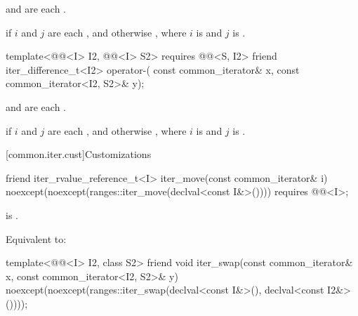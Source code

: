 \begin{itemdescr}
\pnum
\expects
{} and 
are each .

\pnum
\returns
{} if $i$ and $j$ are each , and otherwise
, where
$i$ is  and $j$ is .
\end{itemdescr}

%
\begin{itemdecl}
template<@@<I> I2, @@<I> S2>
  requires @@<S, I2>
friend iter_difference_t<I2> operator-(
  const common_iterator& x, const common_iterator<I2, S2>& y);
\end{itemdecl}

\begin{itemdescr}
\pnum
\expects
{} and 
are each .

\pnum
\returns
{} if $i$ and $j$ are each , and otherwise
, where
$i$ is  and $j$ is .
\end{itemdescr}

[common.iter.cust]{Customizations}

%
\begin{itemdecl}
friend iter_rvalue_reference_t<I> iter_move(const common_iterator& i)
  noexcept(noexcept(ranges::iter_move(declval<const I&>())))
    requires @@<I>;
\end{itemdecl}

\begin{itemdescr}
\pnum
\expects
{} is .

\pnum
\effects
Equivalent to: 
\end{itemdescr}

%
\begin{itemdecl}
template<@@<I> I2, class S2>
  friend void iter_swap(const common_iterator& x, const common_iterator<I2, S2>& y)
    noexcept(noexcept(ranges::iter_swap(declval<const I&>(), declval<const I2&>())));
\end{itemdecl}

